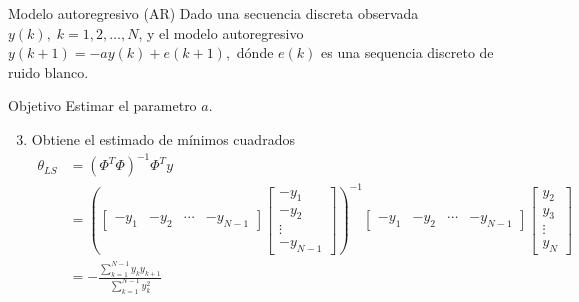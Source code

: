 \documentclass[presentation,aspectratio=169]{beamer}
\begin{document}
\begin{frame}[label={sec:org971fc5e}]{Modelo autoregresivo (AR)}
Dado una secuencia discreta observada \(y(k), \; k=1,2,\ldots,N\), y el modelo autoregresivo
\(y(k+1) = -ay(k) + e(k+1),\)
dónde \(e(k)\) es una sequencia discreto de ruido blanco.

\alert{Objetivo} Estimar el parametro \(a\).

\begin{enumerate}
\setcounter{enumi}{2}
\item Obtiene el estimado de mínimos cuadrados 
\begin{align*}
 \theta_{LS} &= (\Phi^T\Phi)^{-1}\Phi^T y\\ &= \left(\begin{bmatrix} -y_1 & -y_2 & \cdots & -y_{N-1}\end{bmatrix}\begin{bmatrix}-y_1\\-y_2\\\vdots\\-y_{N-1}\end{bmatrix}\right)^{-1}\begin{bmatrix} -y_1 & -y_2 & \cdots & -y_{N-1}\end{bmatrix}\begin{bmatrix}y_2\\y_3\\\vdots\\y_N\end{bmatrix}\\
 &= -\frac{\sum_{k=1}^{N-1} y_ky_{k+1}}{\sum_{k=1}^{N-1}y_k^2}
 \end{align*}
\end{enumerate}
\end{frame}
\end{document}

